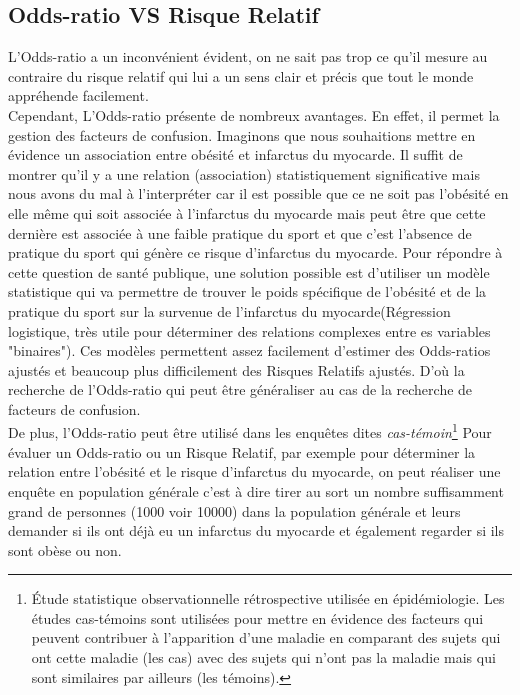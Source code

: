 \subsection{Odds-ratio VS Risque Relatif}
L'Odds-ratio a un inconvénient évident, on ne sait pas trop ce qu'il mesure au contraire du risque relatif qui lui a un sens clair et précis que tout le monde appréhende facilement.\newline
\\
Cependant, L'Odds-ratio présente de nombreux avantages.\newline
En effet, il permet la gestion des facteurs de confusion. Imaginons que nous souhaitions mettre en évidence un association entre obésité et infarctus du myocarde. Il suffit de montrer qu'il y a une relation (association) statistiquement significative mais nous avons du mal à l'interpréter car il est possible que ce ne soit pas l'obésité en elle même qui soit associée à l'infarctus du myocarde mais peut être que cette dernière est associée à une faible pratique du sport et que c'est l'absence de pratique du sport qui génère ce risque d'infarctus du myocarde.\newline
Pour répondre à cette question de santé publique, une solution possible est d'utiliser un modèle statistique qui va permettre de trouver le poids spécifique de l'obésité et de la pratique du sport sur la survenue de l'infarctus du myocarde(Régression logistique, très utile pour déterminer des relations complexes entre es variables "binaires"). Ces modèles permettent assez facilement d'estimer des Odds-ratios ajustés et beaucoup plus difficilement des Risques Relatifs ajustés. 
D'où la recherche de l'Odds-ratio qui peut être généraliser au cas de la recherche de facteurs de confusion.\newline
\\
De plus, l'Odds-ratio peut être utilisé dans les enquêtes dites \textit{cas-témoin}\footnote{Étude statistique observationnelle rétrospective utilisée en épidémiologie. Les études cas-témoins sont utilisées pour mettre en évidence des facteurs qui peuvent contribuer à l'apparition d'une maladie en comparant des sujets qui ont cette maladie (les cas) avec des sujets qui n'ont pas la maladie mais qui sont similaires par ailleurs (les témoins).} Pour évaluer un Odds-ratio ou un Risque Relatif, par exemple pour déterminer la relation entre l'obésité et le risque d'infarctus du myocarde, on peut réaliser une enquête en population générale c'est à dire tirer au sort un nombre suffisamment grand de personnes (1000 voir 10000) dans la population générale et leurs demander si ils ont déjà eu un infarctus du myocarde et également regarder si ils sont obèse ou non.\newline
